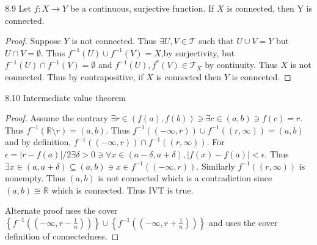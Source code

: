 \documentclass{article}
\newcommand*{\T}{\mathcal{T}}
\newcommand*{\subeq}{\subseteq}
\newcommand*{\empset}{\emptyset}
\newcommand{\R}{\mathbb{R}}
\newcommand{\abs}[1]{\left\lvert #1\right\rvert}
\begin{document}
\bigskip

\begin{claim}{8.9}\label{Claim 8.9.}
    Let $f:X \to Y$  be a continuous, surjective function. If $X$  is connected, then Y is connected.
\end{claim}
\begin{proof}
    Suppose $Y$ is not connected. Thus $\exists U, V \in \T$ such that $U \cup V = Y$ but $U \cap V = \empset$. Thus $f^{-1}(U) \cup f^{-1}(V) = X$,by surjectivity, but $f^{-1}(U) \cap f^{-1}(V) = \empset$ and $f^{-1}(U), f^*(V) \in \T_X$ by continuity. Thus $X$ is not connected. Thus by contrapositive, if $X$ is connected then $Y$ is connected.         
\end{proof}

\bigskip

\begin{claim}{8.10}\label{Claim 8.10.}
    Intermediate value theorem
\end{claim}
\begin{proof}
    Assume the contrary $\exists r \in (f(a), f(b)) \ni \exists c \in (a, b) \ni f(c) = r$. Thus $f^{-1}(\R \setminus {r}) = (a, b)$. Thus $f^{-1}((- \infty, r)) \cup f^{-1}((r, \infty)) = (a, b)$ and by definition, $f^{-1}((- \infty, r)) \cap f^{-1}((r, \infty))$. For $\epsilon = \abs{r - f(a)}/2 \exists \delta > 0 \ni \forall x \in (a - \delta, a + \delta), \abs{f(x) - f(a)} < \epsilon$. Thus $\exists x \in (a, a + \delta) \subeq (a, b) \ni x \in f^{-1}((-\infty, r))$. Similarly $f^{-1}((r, \infty))$ is nonempty. Thus $(a, b)$ is not connected which is a contradiction since $(a, b) \cong \R$ which is connected. Thus IVT is true. 
    
    Alternate proof uses the cover $\left\{ f^{-1}((-\infty, r - \frac{1}{n})) \right\} \cup \left\{ f^{-1}((-\infty, r + \frac{1}{n})) \right\}$ and uses the cover definition of connectedness.  
\end{proof}

\bigskip
\end{document}
